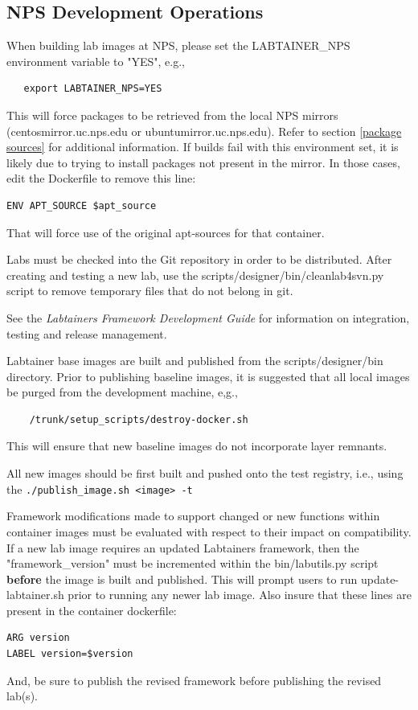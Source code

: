 \documentclass[12pt]{article}
\begin{document}
\subsection{NPS Development Operations}
When building lab images at NPS, please set the LABTAINER\_NPS environment variable to "YES", e.g.,
\begin{verbatim}
   export LABTAINER_NPS=YES
\end{verbatim}
This will force packages to be retrieved from the local NPS mirrors (centosmirror.uc.nps.edu or
ubuntumirror.uc.nps.edu).  Refer to section \ref{package sources} for additional information.
If builds fail with this environment set, it is likely due to trying to install packages not present
in the mirror.  In those cases, edit the Dockerfile to remove this line:
\begin{verbatim}
ENV APT_SOURCE $apt_source
\end{verbatim}
\noindent That will force use of the original apt-sources for that container.

Labs must be checked into the Git repository in order to be distributed.  After creating and testing
a new lab, use the scripts/designer/bin/cleanlab4svn.py script to remove temporary files that do not belong in 
git.  

See the \textit{Labtainers Framework Development Guide} for information on integration, testing and release management.

Labtainer base images are built and published from the scripts/designer/bin directory.  Prior to publishing
baseline images, it is suggested that all local images be purged from the development machine, e,g.,
\begin{verbatim}
    /trunk/setup_scripts/destroy-docker.sh
\end{verbatim}
\noindent This will ensure that new baseline images do not incorporate layer remnants.

All new images should be first built and pushed onto the test registry, i.e., using the 
{\tt ./publish\_image.sh <image> -t}

Framework modifications made to support changed or new functions within container images
must be evaluated with respect to their impact on compatibility. If a new lab image requires
an updated Labtainers framework, then the "framework\_version" must be incremented within the
bin/labutils.py script \textbf{before} the image is built and published.  This will prompt users
to run update-labtainer.sh prior to running any newer lab image. 
Also insure that these lines are present in the container dockerfile:
\begin{verbatim}
ARG version
LABEL version=$version
\end{verbatim}
\noindent And, be sure to publish the revised framework before publishing the revised lab(s).
\end{document}
